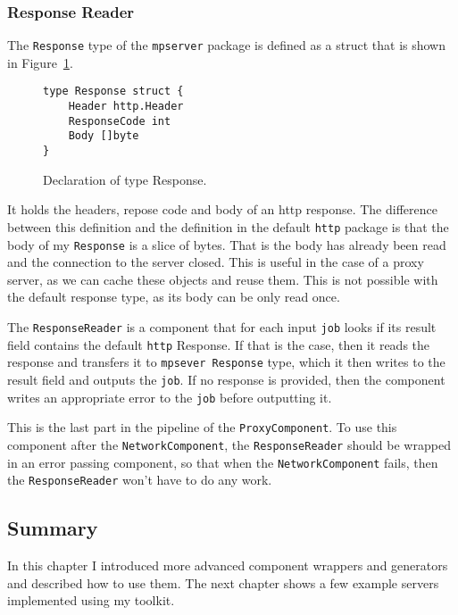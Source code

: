 \newpage
\subsubsection{Response Reader}
The \texttt{Response} type of the \texttt{mpserver} package is defined as
a struct that is shown in Figure~\ref{fig:Response}.
\begin{figure}[h]
\centering
\begin{lstlisting}
type Response struct {
    Header http.Header
    ResponseCode int
    Body []byte
}
\end{lstlisting}
\caption[scale=1.0]{Declaration of type Response.}
\label{fig:Response}
\end{figure}

It holds the headers, repose code and body of an http response. 
The difference between
this definition and the definition in the default \texttt{http} package is that
the body of my \texttt{Response} is a slice of bytes. 
That is the body has already been
read and the connection to the server closed. This is useful
in the case of a proxy server, as we can cache these objects and reuse
them. This is not possible with the default response type,
as its body can be only read once.

The \texttt{ResponseReader} is a component that for each input \texttt{job}
looks if its result field contains the default \texttt{http} Response. 
If that is the case,
then it reads the response and transfers it to \texttt{mpsever Response} 
type, which it
then writes to the result field and outputs the \texttt{job}. If no response
is provided, then the component writes an appropriate error to the
\texttt{job} before outputting it.

This is the last part in the pipeline of the \texttt{ProxyComponent}.
To use this component after the \texttt{NetworkComponent}, 
the \texttt{ResponseReader} should be wrapped in an error passing 
component, so that when the \texttt{Network\-Component} fails, then 
the \texttt{ResponseReader} won't have to do any work.


\subsection{Summary}
In this chapter I introduced more advanced component wrappers and generators
and described how to use them. The next chapter shows a few example
servers implemented using my toolkit.


